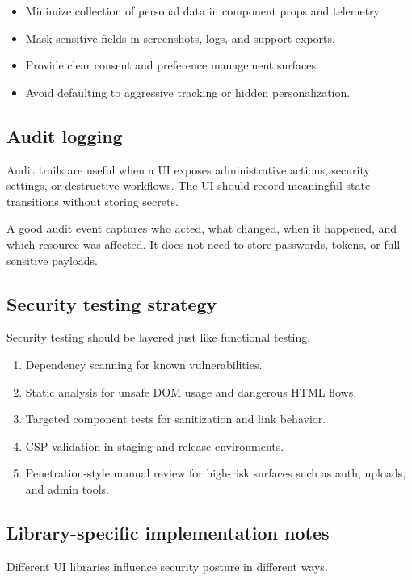 \begin{itemize}[leftmargin=*, itemsep=0.35em]
  \item Minimize collection of personal data in component props and telemetry.
  \item Mask sensitive fields in screenshots, logs, and support exports.
  \item Provide clear consent and preference management surfaces.
  \item Avoid defaulting to aggressive tracking or hidden personalization.
\end{itemize}

\subsection{Audit logging}
Audit trails are useful when a UI exposes administrative actions, security settings, or destructive workflows. The UI should record meaningful state transitions without storing secrets.

A good audit event captures who acted, what changed, when it happened, and which resource was affected. It does not need to store passwords, tokens, or full sensitive payloads.

\subsection{Security testing strategy}
Security testing should be layered just like functional testing.

\begin{enumerate}[leftmargin=*, itemsep=0.3em]
  \item Dependency scanning for known vulnerabilities.
  \item Static analysis for unsafe DOM usage and dangerous HTML flows.
  \item Targeted component tests for sanitization and link behavior.
  \item CSP validation in staging and release environments.
  \item Penetration-style manual review for high-risk surfaces such as auth, uploads, and admin tools.
\end{enumerate}

\subsection{Library-specific implementation notes}
Different UI libraries influence security posture in different ways.

